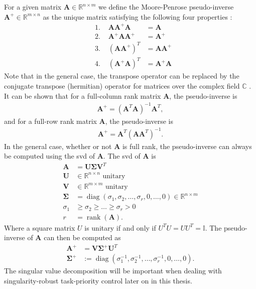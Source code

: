 For a given matrix $\bm{A} \in \mathbb{R}^{n\times m}$ we define the Moore-Penrose
pseudo-inverse $\bm{A}^{+} \in \mathbb{R}^{m\times n}$ as the unique matrix
satisfying the following four properties \cite{penrose1955}:
\begin{subequations}
    \begin{align}
        &\textrm{1. } & \bm{A}\bm{A}^{+}\bm{A} &= \bm{A} \\
        &\textrm{2. } & \bm{A}^{+}\bm{A}\bm{A}^{+} &= \bm{A}^{+} \\
        &\textrm{3. } & (\bm{A}\bm{A}^{+})^T &= \bm{A}\bm{A}^{+} \\
        &\textrm{4. } & (\bm{A}^{+}\bm{A})^T &= \bm{A}^{+}\bm{A}
    \end{align}
\end{subequations}
Note that in the general case, the transpose operator can be replaced by the
conjugate transpose (hermitian) operator for matrices over the complex field $\mathbb{C}$ \cite{penrose1955}.
It can be shown that for a full-column rank matrix $\bm{A}$, the pseudo-inverse is
\begin{align}
    \bm{A}^{+} = (\bm{A}^T \bm{A})^{-1} \bm{A}^T,
\end{align}
and for a full-row rank matrix $\bm{A}$, the pseudo-inverse is
\begin{align}
    \bm{A}^{+} = \bm{A}^T (\bm{A} \bm{A}^T)^{-1}.
\end{align}
In the general case, whether or not $\bm{A}$ is full rank, the pseudo-inverse can always
be computed using the \gls{svd} of $\bm{A}$. The \gls{svd} of $\bm{A}$ is
\begin{subequations}
\begin{align}
    \bm{A} &= \bm{U} \bm{\Sigma} \bm{V}^T \\
    \bm{U} &\in \mathbb{R}^{n\times n} \textrm{ unitary} \\
    \bm{V} &\in \mathbb{R}^{m\times m} \textrm{ unitary} \\
    \bm{\Sigma} &= \operatorname{diag}(\sigma_1, \sigma_2, \ldots, \sigma_r, 0, \ldots, 0) \in \mathbb{R}^{n\times m} \\
    \sigma_1 &\geq \sigma_2 \geq \ldots \geq \sigma_r > 0 \\
    r &= \operatorname{rank}(\bm{A}).
\end{align}
\end{subequations}
Where a square matrix $U$ is unitary if and only if $U^T U = U U^T = \mathbb{I}$. The pseudo-inverse
of $\bm{A}$ can then be computed as
\begin{subequations}
\begin{align}
    \bm{A}^{+} &= \bm{V} \bm{\Sigma}^{+} \bm{U}^T \\
    \bm{\Sigma}^{+} &:= \operatorname{diag}(\sigma_1^{-1}, \sigma_2^{-1}, \ldots, \sigma_r^{-1}, 0, \ldots, 0).
\end{align}
\end{subequations}
The singular value decomposition will be important when dealing with
singularity-robust task-priority control later on in this thesis.

